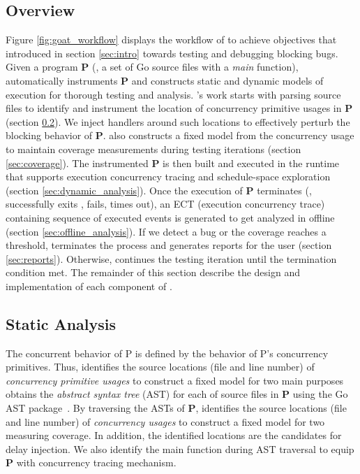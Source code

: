 %
\subsection{Overview}
\label{sec:overview}
Figure \ref{fig:goat_workflow} displays the workflow of \goat to achieve objectives that introduced in section \ref{sec:intro} towards testing and debugging blocking bugs.
%
Given a program \textbf{P} (\ie, a set of Go source files with a \textit{main} function), \goat automatically instruments \textbf{P} and constructs static and dynamic models of execution for thorough testing and analysis.
%
\goat's work starts with parsing source files to identify and instrument the location of concurrency primitive usages in \textbf{P} (section \ref{sec:static_analysis}).
%
We inject \goat handlers around such locations to effectively perturb the blocking behavior of \textbf{P}.
%
\goat also constructs a fixed model from the concurrency usage to maintain coverage measurements during testing iterations (section \ref{sec:coverage}).
%
The instrumented \textbf{P} is then built and executed in the \goat runtime that supports execution concurrency tracing and schedule-space exploration (section \ref{sec:dynamic_analysis}).
%
Once the execution of \textbf{P} terminates (\eg, successfully exits , fails, times out), an ECT (execution concurrency trace) containing sequence of executed events is generated to get analyzed in offline (section \ref{sec:offline_analysis}).
%
If we detect a bug or the coverage reaches a threshold, \goat terminates the process and generates reports for the user (section \ref{sec:reports}). Otherwise, \goat continues the testing iteration until the termination condition met.
%
The remainder of this section describe the design and implementation of each component of \goat.

\subsection{Static Analysis}
\label{sec:static_analysis}
The concurrent behavior of P is defined by the behavior of P's concurrency primitives. 
%
Thus, \goat identifies the source locations (file and line number) of \textit{concurrency primitive usages} to construct a fixed model for two main purposes
\goat obtains the \textit{abstract syntax tree} (AST) for each of source files in \textbf{P} using the Go AST package~\cite{go-package-ast}.
%
By traversing the ASTs of \textbf{P}, \goat identifies the source locations (file and line number) of \textit{concurrency usages} to construct a fixed model for two measuring coverage.
%
In addition, the identified locations are the candidates for delay injection.
%
We also identify the main function during AST traversal to equip \textbf{P} with concurrency tracing mechanism.


